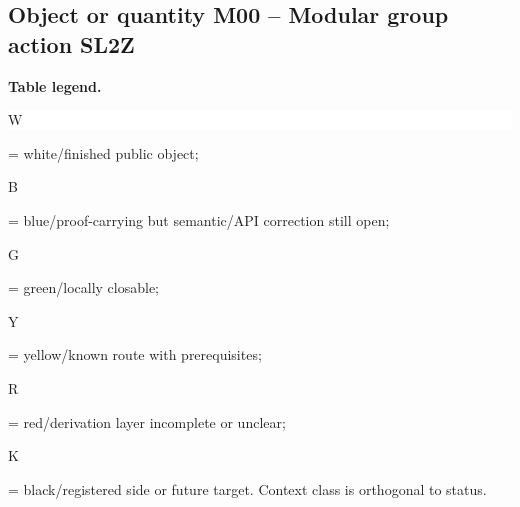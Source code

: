 \subsection*{Object or quantity M00 -- Modular group action SL2Z}
\hypertarget{objproof:M00}{}
\par\smallskip\noindent\begin{minipage}{0.99\linewidth}\footnotesize\raggedright\textbf{Table legend.} \colorbox{white}{\strut W} = white/finished public object; \colorbox{cyan!20}{\strut B} = blue/proof-carrying but semantic/API correction still open; \colorbox{green!18}{\strut G} = green/locally closable; \colorbox{yellow!25}{\strut Y} = yellow/known route with prerequisites; \colorbox{red!20}{\strut R} = red/derivation layer incomplete or unclear; \colorbox{black!18}{\strut K} = black/registered side or future target. Context class is orthogonal to status.\end{minipage}\par\vspace{0.25em}
